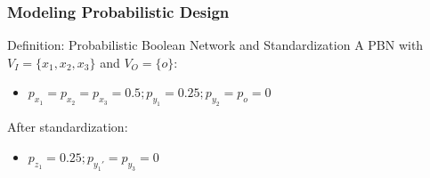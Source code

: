 \begin{frame}
  \frametitle{Modeling Probabilistic Design}
  \begin{block}{Definition: Probabilistic Boolean Network and Standardization}
    A PBN with $V_I=\{x_1,x_2,x_3\}$ and $V_O=\{o\}$:
    \begin{figure}
      \centering
      
    \end{figure}
    \begin{itemize}
      \item $p_{x_1}=p_{x_2}=p_{x_3}=0.5;p_{y_1}=0.25;p_{y_2}=p_{o}=0$
    \end{itemize}
    After standardization:
    \begin{figure}
      \centering
      
    \end{figure}
    \begin{itemize}
      \item $p_{z_1}=0.25;p_{y_1'}=p_{y_3}=0$
    \end{itemize}
  \end{block}
\end{frame}